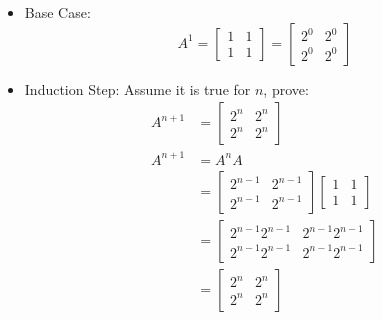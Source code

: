 \documentclass{math}
\begin{document}
\begin{itemize}
  \item Base Case:
  \[ A^1 = \begin{bmatrix}1 & 1 \\ 1 & 1\end{bmatrix} =
    \begin{bmatrix}2^0 & 2^0 \\ 2^0 & 2^0\end{bmatrix} \]
  \item Induction Step: Assume it is true for \( n \), prove:
  \begin{align*}
    A^{n+1} &= \begin{bmatrix}2^n & 2^n \\ 2^n & 2^n\end{bmatrix} \\
    A^{n+1} &= A^nA \\
    &= \begin{bmatrix}2^{n-1} & 2^{n-1} \\ 2^{n-1} & 2^{n-1}\end{bmatrix}
      \begin{bmatrix}1 & 1 \\ 1 & 1\end{bmatrix} \\
    &= \begin{bmatrix}2^{n-1}2^{n-1} & 2^{n-1}2^{n-1} \\
      2^{n-1}2^{n-1} & 2^{n-1}2^{n-1}\end{bmatrix} \\
    &= \begin{bmatrix}2^n & 2^n \\ 2^n & 2^n\end{bmatrix}
  \end{align*}
\end{itemize}
\end{document}
